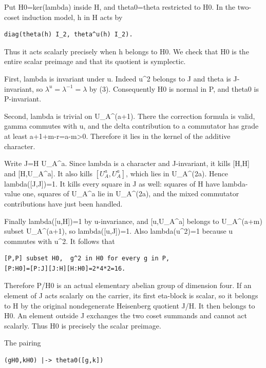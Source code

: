 Put H0=ker(lambda) inside H, and theta0=theta restricted to H0. In the
two-coset induction model, h in H acts by

\begin{Verbatim}[fontsize=\small,breaklines=true,breakanywhere=true]
diag(theta(h) I_2, theta^u(h) I_2).
\end{Verbatim}

Thus it acts scalarly precisely when h belongs to H0. We check that H0
is the entire scalar preimage and that its quotient is symplectic.

First, lambda is invariant under u. Indeed u\^{}2 belongs to J and theta
is J-invariant, so \(\lambda^u=\lambda^{-1}=\lambda\) by (3).
Consequently H0 is normal in P, and theta0 is P-invariant.

Second, lambda is trivial on U\_A\^{}(a+1). There the correction formula
is valid, gamma commutes with u, and the delta contribution to a
commutator has grade at least a+1+m-r=a-m\textgreater0. Therefore it
lies in the kernel of the additive character.

Write J=H U\_A\^{}a. Since lambda is a character and J-invariant, it
kills {[}H,H{]} and {[}H,U\_A\^{}a{]}. It also kills
\([U_A^a,U_A^a]\), which lies in U\_A\^{}(2a). Hence
lambda({[}J,J{]})=1. It kills every square in J as well: squares of H
have lambda-value one, squares of U\_A\^{}a lie in U\_A\^{}(2a), and the
mixed commutator contributions have just been handled.

Finally lambda({[}u,H{]})=1 by u-invariance, and {[}u,U\_A\^{}a{]}
belongs to U\_A\^{}(a+m) subset U\_A\^{}(a+1), so lambda({[}u,J{]})=1.
Also lambda(u\^{}2)=1 because u commutes with u\^{}2. It follows that

\begin{Verbatim}[fontsize=\small,breaklines=true,breakanywhere=true]
[P,P] subset H0,  g^2 in H0 for every g in P,
[P:H0]=[P:J][J:H][H:H0]=2*4*2=16.
\end{Verbatim}

Therefore P/H0 is an actual elementary abelian group of dimension four.
If an element of J acts scalarly on the carrier, its first eta-block is
scalar, so it belongs to H by the original nondegenerate Heisenberg
quotient J/H. It then belongs to H0. An element outside J exchanges the
two coset summands and cannot act scalarly. Thus H0 is precisely the
scalar preimage.

The pairing

\begin{Verbatim}[fontsize=\small,breaklines=true,breakanywhere=true]
(gH0,kH0) |-> theta0([g,k])
\end{Verbatim}

